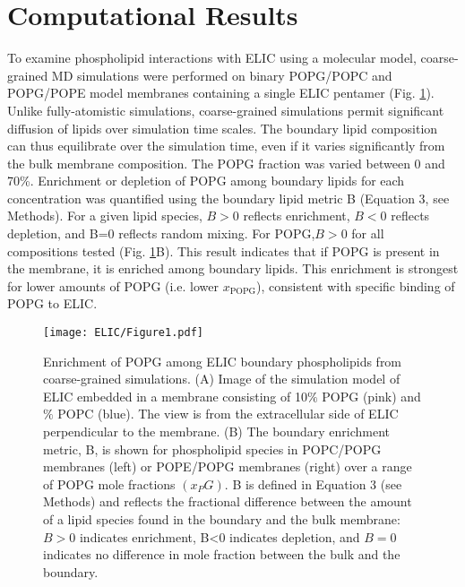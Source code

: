 \section[]{Computational Results}

To examine phospholipid interactions with ELIC using a molecular
model, coarse-grained MD simulations were performed on binary POPG/POPC
and POPG/POPE model membranes containing a single ELIC pentamer (Fig.
\ref{fig:Elic1}). Unlike fully-atomistic simulations, coarse-grained simulations
permit significant diffusion of lipids over simulation time scales. The
boundary lipid composition can thus equilibrate over the simulation
time, even if it varies significantly from the bulk membrane
composition. The POPG fraction was varied between 0 and 70\%. Enrichment
or depletion of POPG among boundary lipids for each concentration was
quantified using the boundary lipid metric B (Equation 3, see Methods).
For a given lipid species, $B>0$ reflects enrichment, $B<0$ reflects depletion, and B=0 reflects random mixing. For
POPG,$B>0$ for all compositions tested (Fig. \ref{fig:Elic1}B). This
result indicates that if POPG is present in the membrane, it is enriched
among boundary lipids. This enrichment is strongest for lower amounts of
POPG (i.e. lower $x_{\text{POPG}}$), consistent with specific binding
of POPG to ELIC.

\begin{figure}[htp]
	\center
\texttt{[image: ELIC/Figure1.pdf]}
\caption{Enrichment of POPG among ELIC boundary phospholipids from coarse-grained simulations. (A) Image of the simulation model of ELIC embedded in a membrane consisting of 10$\%$ POPG (pink) and $\%$ POPC (blue). The view is from the extracellular side of ELIC perpendicular to the membrane. (B) The boundary enrichment metric, B, is shown for phospholipid species in POPC/POPG membranes (left) or POPE/POPG membranes (right) over a range of POPG mole fractions $(x_PG)$. B is defined in Equation 3 (see Methods) and reflects the fractional difference between the amount of a lipid species found in the boundary and the bulk membrane: $B>0$ indicates enrichment, B<0 indicates depletion, and $B = 0$ indicates no difference in mole fraction between the bulk and the boundary. }
\label{fig:Elic1}
\end{figure}


